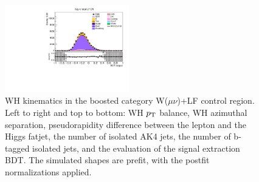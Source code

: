 \begin{figure}[tbp]
\begin{center}
    \includegraphics[width=0.48\textwidth]{figures/wlnhbb2016/boosted/WmnWHLightFlavorFJCR_bdtValue.pdf}
    \caption{WH kinematics in the boosted category W($\mu\nu$)+LF control region.
    Left to right and top to bottom: WH $p_{\mathrm{T}}$ balance, WH azimuthal separation,
    pseudorapidity difference between the lepton and the Higgs fatjet,
    the number of isolated AK4 jets, the number of b-tagged isolated jets,
    and the evaluation of the signal extraction BDT.
    The simulated shapes are prefit, with the postfit normalizations applied.}
    \label{fig:boost_WmnLF_WH}
  \end{center}
\end{figure}
\clearpage

